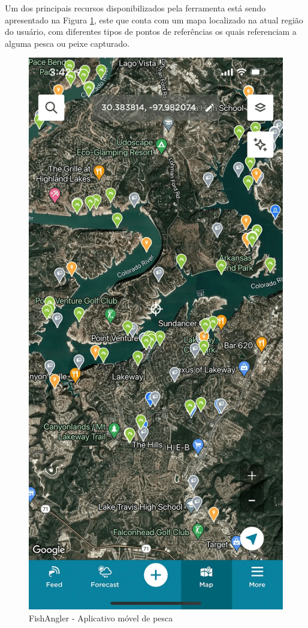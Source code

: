 Um dos principais recursos disponibilizados pela ferramenta está sendo apresentado na Figura \ref{fig:fishAnglerApp}, este que conta com um mapa localizado na atual região do usuário, com diferentes tipos de pontos de referências os quais referenciam a alguma pesca ou peixe capturado.

\begin{figure}[H]
    \centering
    \caption{FishAngler - Aplicativo móvel de pesca}
    \label{fig:fishAnglerApp}
    \includegraphics[scale=0.25]{./dados/figuras/fish-angler-app-map}
\end{figure}

